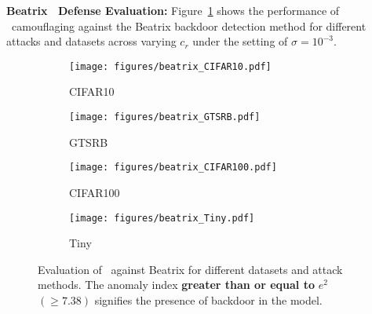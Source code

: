 \vspace{0.2cm}
\noindent \textbf{Beatrix~\cite{beatrix} Defense Evaluation:} Figure~\ref{fig:beatrix} shows the performance of \methodname~camouflaging against the Beatrix backdoor detection method for different attacks and datasets across varying $c_{r}$ under the setting of $\sigma = 10^{-3}$.
\begin{figure}[!t]
    \centering
    \begin{subfigure}{0.48\linewidth}
        \centering
        \texttt{[image: figures/beatrix\_CIFAR10.pdf]}
        \caption{CIFAR10}
    \end{subfigure}\hspace{0.1cm}
    \begin{subfigure}{0.48\linewidth}
        \centering
        \texttt{[image: figures/beatrix\_GTSRB.pdf]}
        \caption{GTSRB}
    \end{subfigure}
    \begin{subfigure}{0.48\linewidth}
        \centering
        \texttt{[image: figures/beatrix\_CIFAR100.pdf]}
        \caption{CIFAR100}
    \end{subfigure}\hspace{0.1cm}
    \begin{subfigure}{0.48\linewidth}
        \centering
        \texttt{[image: figures/beatrix\_Tiny.pdf]}
        \caption{Tiny}
    \end{subfigure}
    \caption{Evaluation of \methodname~against Beatrix for different datasets and attack methods. The anomaly index \textbf{greater than or equal to} $e^2$ $(\geq 7.38)$ signifies the presence of backdoor in the model.}
    \label{fig:beatrix}
\end{figure}
